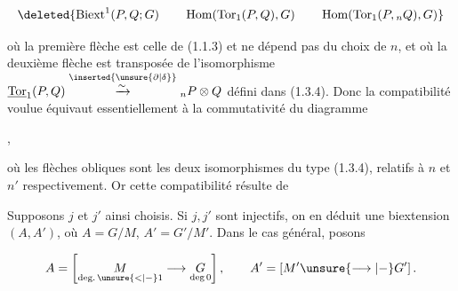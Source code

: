 \[
\deleted{\operatorname{Biext}^1(P,Q;G)\qquad\operatorname{Hom}(\operatorname{Tor}_1(P,Q),G)\qquad\operatorname{Hom}(\operatorname{Tor}_1(P,{}_nQ),G)}
\]

où la première flèche est celle de (1.1.3) et ne dépend pas du choix de $n$, et où la deuxième flèche est transposée de l'isomorphisme $\underline{\operatorname{Tor}}_1(P,Q)\overset{\inserted{\unsure{\partial|\delta}}}{\xrightarrow{\sim}}{}_nP\otimes Q$ défini dans (1.3.4). Donc la compatibilité voulue équivaut essentiellement à  la commutativité du diagramme

,

où les flèches obliques sont les deux isomorphismes du type (1.3.4), relatifs à $n$ et $n'$ respectivement. Or cette compatibilité résulte de



Supposons $j$ et $j'$ ainsi choisis. Si $j,j'$ sont injectifs, on en déduit une biextension
 $(A,A')$, où $A=G/M$, $A'=G'/M'$. Dans le cas général, posons

\[
A=\left[\underset{\text{deg.}\,\unsure{<|-}1}{M}\longrightarrow\underset{\text{deg}\,0}{G}\right],\qquad
A'=\left[M'\unsure{\longrightarrow|\mathbin{-}}G'\right].
\]

